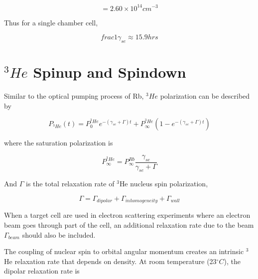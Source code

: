 \begin{equation}
[Rb]=2.60\times 10^{14}cm^{-3}
\end{equation}

Thus for a single chamber cell,

\begin{equation}
frac{1}{\gamma_{se}}\approx 15.9 hrs
\end{equation}

\section{$^{3}He$ Spinup and Spindown}

Similar to the optical pumping process of Rb, $^{3}He$ polarization can be described by

\begin{equation}
P_{^{3}He}(t)=P_{0}^{^{3}He}e^{-(\gamma_{se}+\Gamma)t}+P_{\infty}^{^{3}He}(1-e^{-(\gamma_{se}+\Gamma)t})
\end{equation}

where the saturation polarization is

\begin{equation}
P_{\infty}^{^{3}He}=P_{\infty}^{Rb}\frac{\gamma_{se}}{\gamma_{se}+\Gamma}
\end{equation}

And $\Gamma$ is the total relaxation rate of $^{3}$He nucleus spin polarization,

\begin{equation}
\Gamma=\Gamma_{dipolar}+\Gamma_{inhomogeneity}+\Gamma_{wall}
\end{equation}

When a target cell are used in electron scattering experiments where an electron beam goes through part of the cell, an additional relaxation rate due to the beam $\Gamma_{beam}$ should also be included.

The coupling of nuclear spin to orbital angular momentum creates an intrinsic $^{3}$He relaxation rate that depends on density. At room temperature (23$^{\circ}C$), the dipolar relaxation rate is 



















